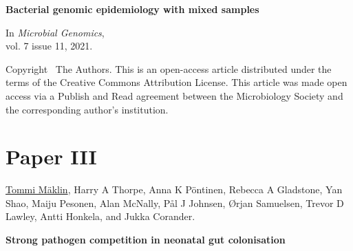 \vspace{10pt}
\noindent\textbf{Bacterial genomic epidemiology with mixed samples}

\vspace{10pt}
\noindent In 
\emph{Microbial Genomics}, 
\\vol. 7 issue 11, 2021.

\vspace{60pt}
\noindent Copyright \textcopyright\ The Authors. This is an
open-access article distributed under the terms of the Creative
Commons Attribution License. This article was made open access via a
Publish and Read agreement between the Microbiology Society and the
corresponding author’s institution.

\cleardoublepage




\chapter*{Paper III}\thispagestyle{plain}







\vspace{80pt}
\underline{Tommi Mäklin}, Harry A Thorpe, Anna K Pöntinen, Rebecca
A Gladstone, Yan Shao, Maiju Pesonen, Alan McNally, Pål J Johnsen,
Ørjan Samuelsen, Trevor D Lawley, Antti Honkela, and Jukka
Corander.

\vspace{10pt}
\noindent\textbf{Strong pathogen competition in neonatal gut colonisation}

